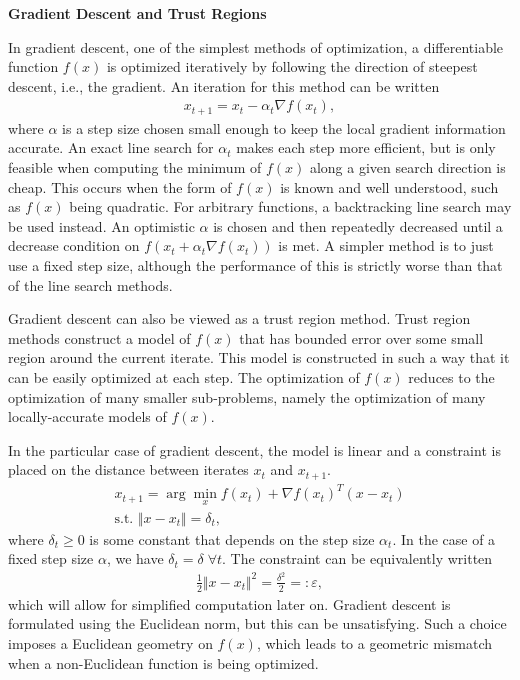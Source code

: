 \documentclass[twoside,10pt]{article}
\newcommand{\subheader}[1]{\bigskip\begin{center}\textbf{#1}\end{center}}
\begin{document}
\subheader{Gradient Descent and Trust Regions}
In gradient descent, one of the simplest methods of optimization, a differentiable function $f(x)$ is optimized iteratively by following the direction of steepest descent, i.e., the gradient. An iteration for this method can be written
\begin{gather*}
    x_{t+1} = x_t - \alpha_t \nabla f(x_t),
\end{gather*}
where $\alpha$ is a step size chosen small enough to keep the local gradient information accurate. An exact line search for $\alpha_t$ makes each step more efficient, but is only feasible when computing the minimum of $f(x)$ along a given search direction is cheap. This occurs when the form of $f(x)$ is known and well understood, such as $f(x)$ being quadratic. For arbitrary functions, a backtracking line search may be used instead. An optimistic $\alpha$ is chosen and then repeatedly decreased until a decrease condition on $f(x_t + \alpha_t \nabla f(x_t))$ is met. A simpler method is to just use a fixed step size, although the performance of this is strictly worse than that of the line search methods.

Gradient descent can also be viewed as a trust region method\cite{tr}. Trust region methods construct a model of $f(x)$ that has bounded error over some small region around the current iterate. This model is constructed in such a way that it can be easily optimized at each step. The optimization of $f(x)$ reduces to the optimization of many smaller sub-problems, namely the optimization of many locally-accurate models of $f(x)$.

In the particular case of gradient descent, the model is linear and a constraint is placed on the distance between iterates $x_t$ and $x_{t+1}$.
\begin{gather*}
    x_{t+1} = \arg\min_x f(x_t) + \nabla f(x_t)^T (x-x_t) \\
    \text{s.t. } \Vert x - x_t \Vert = \delta_t,
\end{gather*}
where $\delta_t \geq 0$ is some constant that depends on the step size $\alpha_t$. In the case of a fixed step size $\alpha$, we have $\delta_t = \delta \; \forall t$. The constraint can be equivalently written
\begin{gather*}
    \frac{1}{2} \Vert x - x_t \Vert^2 = \frac{\delta^2}{2} =: \varepsilon,
\end{gather*}
which will allow for simplified computation later on. Gradient descent is formulated using the Euclidean norm, but this can be unsatisfying. Such a choice imposes a Euclidean geometry on $f(x)$, which leads to a geometric mismatch when a non-Euclidean function is being optimized.
\end{document}
